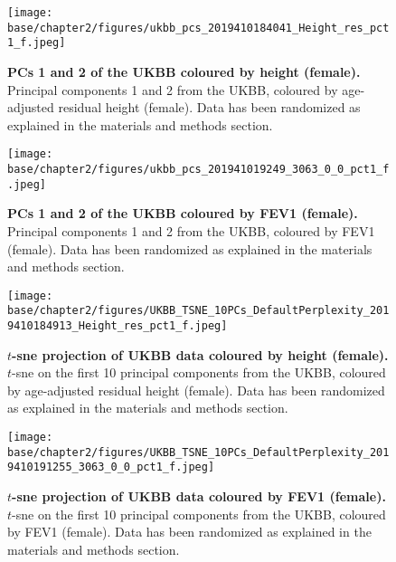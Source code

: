 \newpage

\begin{figure}[ht]
    \centering
    \texttt{[image: base/chapter2/figures/ukbb\_pcs\_2019410184041\_Height\_res\_pct1\_f.jpeg]}
    \caption[PCs 1 and 2 of the UKBB coloured by height (female)]{\textbf{PCs 1 and 2 of the UKBB coloured by height (female).} Principal components 1 and 2 from the UKBB, coloured by age-adjusted residual height (female). Data has been randomized as explained in the materials and methods section.}
    \label{fig:supp_ukbb_pca_height_res_f}
\end{figure}

\newpage

\begin{figure}[ht]
    \centering
    \texttt{[image: base/chapter2/figures/ukbb\_pcs\_201941019249\_3063\_0\_0\_pct1\_f.jpeg]}
    \caption[PCs 1 and 2 of the UKBB coloured by FEV1 (female)]{\textbf{PCs 1 and 2 of the UKBB coloured by FEV1 (female).} Principal components 1 and 2 from the UKBB, coloured by FEV1 (female). Data has been randomized as explained in the materials and methods section.}
    \label{fig:supp_ukbb_pca_fev_f}
\end{figure}

\clearpage
\begin{figure}[ht]
    \centering
    \texttt{[image: base/chapter2/figures/UKBB\_TSNE\_10PCs\_DefaultPerplexity\_2019410184913\_Height\_res\_pct1\_f.jpeg]}
    \caption[$t$-sne projection of UKBB data coloured by height (female)]{\textbf{$t$-sne projection of UKBB data coloured by height (female).} $t$-sne on the first 10 principal components from the UKBB, coloured by age-adjusted residual height (female). Data has been randomized as explained in the materials and methods section.}
    \label{fig:supp_ukbb_tsne_height_res_f}
\end{figure}

\newpage

\begin{figure}[ht]
    \centering
    \texttt{[image: base/chapter2/figures/UKBB\_TSNE\_10PCs\_DefaultPerplexity\_2019410191255\_3063\_0\_0\_pct1\_f.jpeg]}
    \caption[$t$-sne projection of UKBB data coloured by FEV1 (female)]{\textbf{$t$-sne projection of UKBB data coloured by FEV1 (female).} $t$-sne on the first 10 principal components from the UKBB, coloured by FEV1 (female). Data has been randomized as explained in the materials and methods section.}
    \label{fig:supp_ukbb_tsne_fev_f}
\end{figure}

